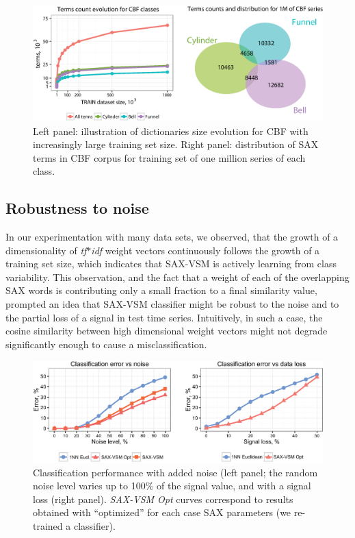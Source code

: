 \begin{figure}[b]
   \centering
   \includegraphics[width=140mm]{figures/Bubbles.eps}
   \caption{Left panel: illustration of dictionaries size evolution for CBF with
   increasingly large training set size. 
   Right panel: distribution of SAX terms in CBF corpus for training set of 
   one million series of each class.}
   \label{fig:venn}
\end{figure}

\subsection{Robustness to noise}
In our experimentation with many data sets, we observed, that the growth of a 
dimensionality of \textit{tf$\ast$idf} weight vectors continuously follows the growth of a
training set size, which indicates that SAX-VSM is actively learning from class variability.
This observation, and the fact that a weight of each of the overlapping SAX words is 
contributing only a small fraction to a final similarity value, prompted an idea that 
SAX-VSM classifier might be robust to the noise and to the partial loss of a signal in
test time series. Intuitively, in such a case, the cosine similarity between high dimensional 
weight vectors might not degrade significantly enough to cause a misclassification.

\begin{figure}[t]
  \centering
  \includegraphics[width=140mm]{figures/corrupted.eps}
  \caption{Classification performance with added noise
  (left panel; the random noise level varies up to 100\% of the signal value,
  and with a signal loss (right panel). \textit{SAX-VSM Opt} curves correspond to 
  results obtained with ``optimized'' for each case SAX parameters 
  (we re-trained a classifier).}
  \label{fig:corrupted}
\end{figure}

